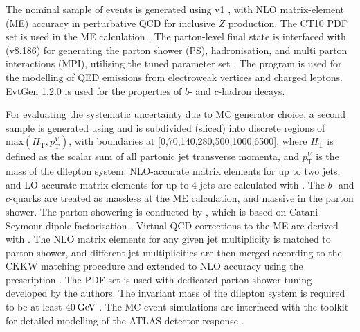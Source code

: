 The nominal sample of \zjet events is generated using \POWHEGBOX v1 \cite{Insitu:powheg1,Insitu:powheg2,Insitu:powheg3}, with NLO matrix-element (ME) accuracy in perturbative QCD for inclusive $Z$ production. The CT10 PDF set is used in the ME calculation \cite{Insitu:ct10}. The parton-level final state is interfaced with \PYTHIA (v8.186) \cite{Insitu:pythia} for generating the parton shower (PS), hadronisation, and multi parton interactions (MPI), utilising the \AZNLO tuned parameter set \cite{Insitu:aznlo}. The \PHOTOSpp program \cite{Insitu:photos} is used for the modelling of QED emissions from electroweak vertices and charged leptons. EvtGen 1.2.0 \cite{Insitu:evtgen} is used for the properties of $b$- and $c$-hadron decays.

For evaluating the systematic uncertainty due to MC generator choice, a second \zjets sample is generated using  \cite{Insitu:sherpa,Insitu:sherpa22} and is subdivided (sliced) into discrete regions of $\text{max}(H_\text{T},p_{\text{T}}^V)$, with boundaries at [0,70,140,280,500,1000,6500]\GeV, where $H_\text{T}$ is defined as the scalar sum of all partonic jet transverse momenta, and $p_{\text{T}}^V$ is the mass of the dilepton system. NLO-accurate matrix elements for up to two jets, and LO-accurate matrix elements for up to 4 jets are calculated with \COMIX \cite{Insitu:comix}. The $b$- and $c$-quarks are treated as massless at the ME calculation, and massive in the parton shower. The parton showering is conducted by \CSShower \cite{Insitu:csshower}, which is based on Catani-Seymour dipole factorisation \cite{Insitu:csalgorithm}. Virtual QCD corrections to the ME are derived with \OPENLOOPS \cite{Insitu:openloops}. The NLO matrix elements for any given jet multiplicity is matched to parton shower, and different jet multiplicities are then merged according to the CKKW matching procedure \cite{Insitu:ckkw1,Insitu:ckkw2} and extended to NLO accuracy using the \MEPSatNLO prescription \cite{Insitu:meps}. The \NNPDF PDF set \cite{Insitu:nnpdf} is used with dedicated parton shower tuning developed by the \SHERPA authors. The invariant mass of the dilepton system is required to be at least $40\hspace{2pt}\text{Ge\kern -0.1em V}$ \cite{Insitu:zjetmc}. The MC event simulations are interfaced with the \GEANT toolkit \cite{GEANT4} for detailed modelling of the ATLAS detector response \cite{Insitu:atlassim}. %

